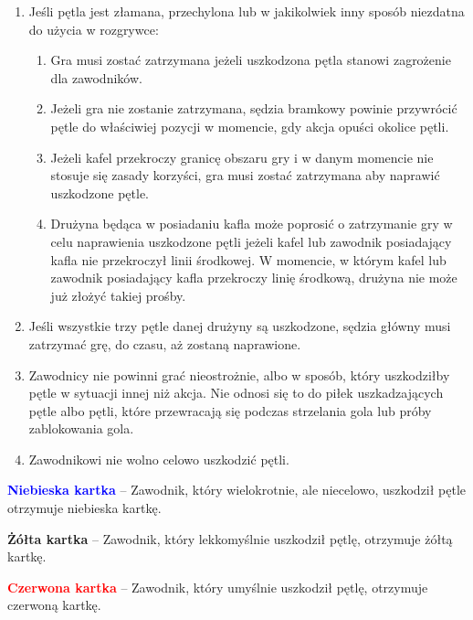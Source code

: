 \documentclass[12pt]{article}
\newcommand\redcard[1]{\bgroup\textcolor{red}{\textbf{#1}}}
\newcommand\yellowcard[1]{\bgroup\textcolor{darkyellow}{\textbf{#1}}}
\newcommand\bluecard[1]{\bgroup\textcolor{blue}{\textbf{#1}}}
\begin{document}
\begin{enumerate}
	\item
	      Jeśli pętla jest złamana, przechylona lub w jakikolwiek inny sposób
	      niezdatna do użycia w rozgrywce:

	      \begin{enumerate}
		      \item
		            Gra musi zostać zatrzymana jeżeli uszkodzona pętla stanowi
		            zagrożenie dla zawodników.
		      \item
		            Jeżeli gra nie zostanie zatrzymana, sędzia bramkowy powinie
		            przywrócić pętle do właściwiej pozycji w momencie, gdy akcja opuści
		            okolice pętli.
		      \item
		            Jeżeli kafel przekroczy granicę obszaru gry i w danym momencie nie
		            stosuje się zasady korzyści, gra musi zostać zatrzymana aby naprawić
		            uszkodzone pętle.
		      \item
		            Drużyna będąca w posiadaniu kafla może poprosić o zatrzymanie gry w
		            celu naprawienia uszkodzone pętli jeżeli kafel lub zawodnik
		            posiadający kafla nie przekroczył linii środkowej. W momencie, w
		            którym kafel lub zawodnik posiadający kafla przekroczy linię
		            środkową, drużyna nie może już złożyć takiej prośby.
	      \end{enumerate}
	\item
	      Jeśli wszystkie trzy pętle danej drużyny są uszkodzone, sędzia główny
	      musi zatrzymać grę, do czasu, aż zostaną naprawione.
	\item
	      Zawodnicy nie powinni grać nieostrożnie, albo w sposób, który
	      uszkodziłby pętle w sytuacji innej niż akcja. Nie odnosi się to do
	      piłek uszkadzających pętle albo pętli, które przewracają się podczas
	      strzelania gola lub próby zablokowania gola.
	\item
	      Zawodnikowi nie wolno celowo uszkodzić pętli.
\end{enumerate}

\bluecard{Niebieska kartka} -- Zawodnik, który wielokrotnie, ale niecelowo,
uszkodził pętle otrzymuje niebieska kartkę.

\yellowcard{Żółta kartka} -- Zawodnik, który lekkomyślnie uszkodził pętlę,
otrzymuje żółtą kartkę.

\redcard{Czerwona kartka} -- Zawodnik, który umyślnie uszkodził
pętlę, otrzymuje czerwoną kartkę.
\end{document}
